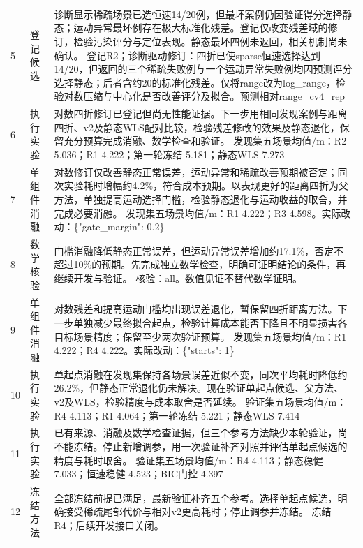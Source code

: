 \begin{longtable}{@{}p{8mm}p{21mm}p{\dimexpr\linewidth-29mm-16pt\relax}@{}}
5 & 登记候选 & 诊断显示稀疏场景已选恒速14/20例，但最坏案例仍因验证得分选择静态；运动异常最坏例存在极大标准化残差。登记仅改变残差域的修订，检验污染评分与定位表现。静态最坏四例未返回，相关机制尚未确认。 登记R2；诊断驱动修订：四折已使sparse恒速选择达到14/20，但返回的三个稀疏失败例与一个运动异常失败例均因预测评分选择静态；后者含约20的标准化残差。仅将range改为log\_\allowbreak{}range，检验对数压缩与中心化是否改善评分及拟合。预测相对range\_\allowbreak{}cv4\_\allowbreak{}rep\\[3pt]

6 & 执行实验 & 对数四折修订已登记但尚无性能证据。下一步用相同发现案例与距离四折、v2及静态WLS配对比较，检验残差修改的效果及静态退化，保留充分预算完成消融、数学检查和验证。 发现集五场景均值/m：R2 5.036；R1 4.222；第一轮冻结 5.181；静态WLS 7.273\\[3pt]

7 & 单组件消融 & 对数修订仅改善静态正常误差，运动异常和稀疏改善预期被否定；同次实验耗时增幅约4.2\%，符合成本预期。以表现更好的距离四折为父方法，单独提高运动选择门槛，检验静态退化与运动收益的取舍，并完成必要消融。 发现集五场景均值/m：R1 4.222；R3 4.598。实际改动：\{"gate\_\allowbreak{}margin": 0.2\}\\[3pt]

8 & 数学核验 & 门槛消融降低静态正常误差，但运动异常误差增加约17.1\%，否定不超过10\%的预期。先完成独立数学检查，明确可证明结论的条件，再继续开发与验证。 核验：all。数值见证不替代数学证明。\\[3pt]

9 & 单组件消融 & 对数残差和提高运动门槛均出现误差退化，暂保留四折距离方法。下一步单独减少最终拟合起点，检验计算成本能否下降且不明显损害各目标场景精度；保留至少两次验证预算。 发现集五场景均值/m：R1 4.222；R4 4.222。实际改动：\{"starts": 1\}\\[3pt]

10 & 执行实验 & 单起点消融在发现集保持各场景误差近似不变，同次平均耗时降低约26.2\%，但静态正常退化仍未解决。现在验证单起点候选、父方法、v2及WLS，检验精度与成本取舍是否延续。 验证集五场景均值/m：R4 4.113；R1 4.064；第一轮冻结 5.221；静态WLS 7.414\\[3pt]

11 & 执行实验 & 已有来源、消融及数学检查证据，但三个参考方法缺少本轮验证，尚不能冻结。停止新增调参，用一次验证补齐对照并评估单起点候选的精度与耗时取舍。 验证集五场景均值/m：R4 4.113；静态稳健 7.033；恒速稳健 4.523；BIC门控 4.397\\[3pt]

12 & 冻结方法 & 全部冻结前提已满足，最新验证补齐五个参考。选择单起点候选，明确接受稀疏尾部代价与相对v2更高耗时；停止调参并冻结。 冻结R4；后续开发接口关闭。\\[3pt]

\bottomrule\end{longtable}\endgroup

